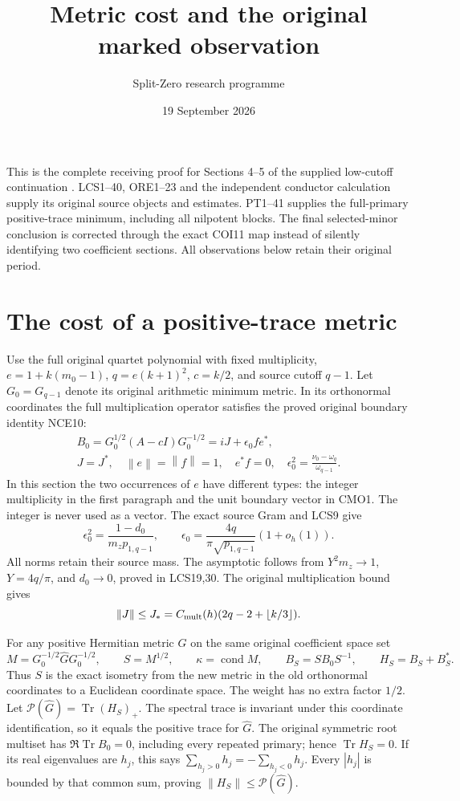 \documentclass[11pt]{article}
\title{Metric cost and the original marked observation}
\author{Split-Zero research programme}\date{19 September 2026}
\newcommand{\Tr}{\operatorname{Tr}}
\newcommand{\cond}{\operatorname{cond}}
\newcommand{\norm}[1]{\left\lVert#1\right\rVert}
\begin{document}
\maketitle

This is the complete receiving proof for Sections 4--5 of the
supplied low-cutoff continuation \cite{source}. LCS1--40, ORE1--23 and the
independent conductor calculation supply its original source
objects and estimates. PT1--41 \cite{PT} supplies the full-primary
positive-trace minimum, including all nilpotent blocks.
The final selected-minor conclusion is corrected through the
exact COI11 map \cite{COI} instead of silently identifying two coefficient
sections. All observations below retain their original period.

\section{The cost of a positive-trace metric}
Use the full original quartet polynomial with fixed multiplicity,
$e=1+k(m_0-1)$, $q=e(k+1)^2$, $c=k/2$, and source cutoff $q-1$.
Let $G_0=G_{q-1}$ denote its original arithmetic minimum metric.
In its orthonormal coordinates the full multiplication operator
satisfies the proved original boundary identity NCE10:
\begin{equation}\tag{CMO1}
 \begin{gathered}
 B_0=G_0^{1/2}(A-cI)G_0^{-1/2}=iJ+\epsilon_0fe^*,\\
 J=J^*,\quad \norm e=\norm f=1,\quad e^*f=0,\quad
 \epsilon_0^2=\frac{\nu_0-\omega_q}{\omega_{q-1}} .
 \end{gathered}
\end{equation}
In this section the two occurrences of $e$ have different types:
the integer multiplicity in the first paragraph and the unit
boundary vector in CMO1. The integer is never used as a vector.
The exact source Gram and LCS9 give
\begin{equation}\tag{CMO2}
 \epsilon_0^2=\frac{1-d_0}{m_zp_{1,q-1}},\qquad
 \epsilon_0=\frac{4q}{\pi\sqrt{p_{1,q-1}}}(1+o_h(1)).
\end{equation}
All norms retain their source mass. The asymptotic follows from
$Y^2m_z\to1$, $Y=4q/\pi$, and $d_0\to0$, proved in LCS19,30.
The original multiplication bound gives
\[
 \norm J\le J_*=
 C_{\rm mult}(h)(2q-2+\lfloor k/3\rfloor).
\]

For any positive Hermitian metric $\widehat G$ on the same
original coefficient space set
\[
 M=G_0^{-1/2}\widehat G G_0^{-1/2},\qquad
 S=M^{1/2},\qquad \kappa=\cond M,\qquad
 B_S=SB_0S^{-1},\qquad H_S=B_S+B_S^* .
\]
Thus $S$ is the exact isometry from the new metric in the old
orthonormal coordinates to a Euclidean coordinate space.
The weight has no extra factor $1/2$.
Let $\mathcal P(\widehat G)=\Tr(H_S)_+$.
The spectral trace is invariant under this coordinate
identification, so it equals the positive trace for $\widehat G$.
The original symmetric root multiset has $\Re\Tr B_0=0$,
including every repeated primary; hence $\Tr H_S=0$.
If its real eigenvalues are $h_j$, this says
$\sum_{h_j>0}h_j=-\sum_{h_j<0}h_j$.
Every $|h_j|$ is bounded by that common sum, proving
$\norm{H_S}\le\mathcal P(\widehat G)$.
\end{document}
